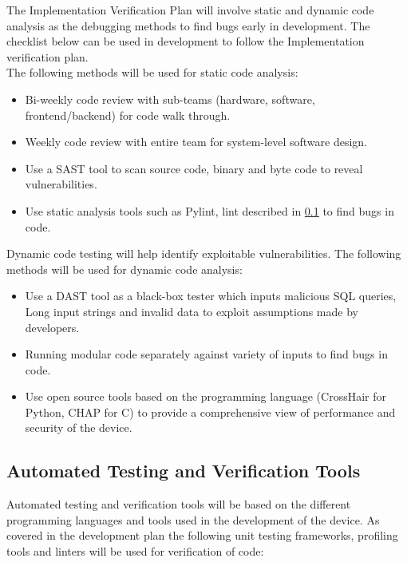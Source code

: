 \documentclass[12pt, titlepage]{article}
\begin{document}
The Implementation Verification Plan will involve static and dynamic code analysis as the debugging methods to find bugs early in development. The checklist below can be used in development to follow the Implementation verification plan.\\
The following methods will be used for static code analysis:
\begin{itemize}
  \item Bi-weekly code review with sub-teams (hardware, software, frontend/backend) for code walk through.
  \item Weekly code review with entire team for system-level software design.
  \item Use a SAST tool to scan source code, binary and byte code to reveal vulnerabilities.
  \item Use static analysis tools such as Pylint, lint described in \ref{Automation} to find bugs in code.
\end{itemize}
Dynamic code testing will help identify exploitable vulnerabilities. The following methods will be used for dynamic code analysis:
\begin{itemize}
  \item Use a DAST tool as a black-box tester which inputs malicious SQL queries, Long input strings and invalid data to exploit assumptions made by developers.
  \item Running modular code separately against variety of inputs to find bugs in code.
  \item Use open source tools based on the programming language (CrossHair for Python, CHAP for C) to provide a comprehensive view of performance and security of the device.
\end{itemize}


\subsection{Automated Testing and Verification Tools}\label{Automation}

Automated testing and verification tools will be based on the different programming languages and tools used in the development of the device. As covered in the development plan \cite{Development_Plan} the following unit testing frameworks, profiling tools and linters will be used for verification of code:
\end{document}
